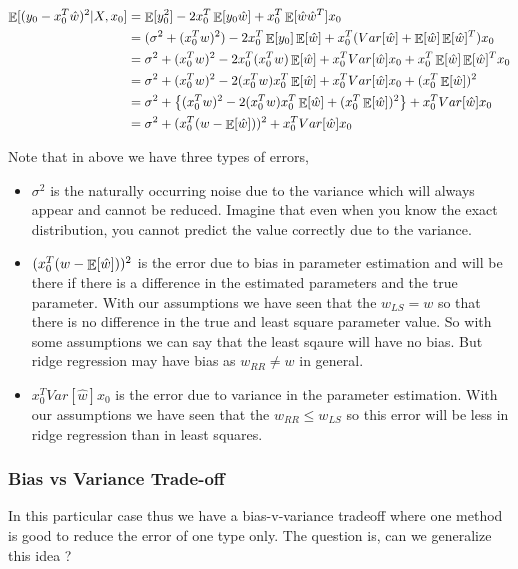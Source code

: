 \documentclass{article}
\begin{document}
\begin{align*}
    \operatorname*{\mathop{\mathbb{E}}}[(y_0-x_0^T\hat{w})^2 \vert X, x_0] &= \operatorname*{\mathop{\mathbb{E}}}[y_0^2] - 2x_0^T\operatorname*{\mathop{\mathbb{E}}}[y_0\hat{w}] + x_0^T\operatorname*{\mathop{\mathbb{E}}}[\hat{w}\hat{w}^T]x_0\\
    &= (\sigma^2 + (x_0^Tw)^2) - 2x_0^T\operatorname*{\mathop{\mathbb{E}}}[y_0]\operatorname*{\mathop{\mathbb{E}}}[\hat{w}] + x_0^T (Var[\hat{w}] + \operatorname*{\mathop{\mathbb{E}}}[\hat{w}]\operatorname*{\mathop{\mathbb{E}}}[\hat{w}]^T) x_0\\
    &= \sigma^2 + (x_0^Tw)^2 - 2x_0^T (x_0^Tw) \operatorname*{\mathop{\mathbb{E}}}[\hat{w}] + x_0^T Var[\hat{w}]x_0 + x_0^T \operatorname*{\mathop{\mathbb{E}}}[\hat{w}]\operatorname*{\mathop{\mathbb{E}}}[\hat{w}]^T x_0\\
    &= \sigma^2 + (x_0^Tw)^2 - 2(x_0^Tw) x_0^T \operatorname*{\mathop{\mathbb{E}}}[\hat{w}] + x_0^T Var[\hat{w}]x_0 + (x_0^T \operatorname*{\mathop{\mathbb{E}}}[\hat{w}])^2\\
    &= \sigma^2 + \left\{ (x_0^Tw)^2 - 2(x_0^Tw) x_0^T \operatorname*{\mathop{\mathbb{E}}}[\hat{w}] + (x_0^T \operatorname*{\mathop{\mathbb{E}}}[\hat{w}])^2 \right\} + x_0^T Var[\hat{w}]x_0\\
    &= \sigma^2 + (x_0^T (w - \operatorname*{\mathop{\mathbb{E}}}[\hat{w}]))^2 + x_0^T Var[\hat{w}]x_0\\   
\end{align*}

Note that in above we have three types of errors,
\begin{itemize}
    \item {} $\sigma^2$ is the naturally occurring noise due to the variance which will always appear and cannot be reduced. Imagine that even when you know the exact distribution, you cannot predict the value correctly due to the variance.
    \item {} $(x_0^T (w - \operatorname*{\mathop{\mathbb{E}}}[\hat{w}]))^2$ is the error due to bias in parameter estimation and will be there if there is a difference in the estimated parameters and the true parameter. With our assumptions we have seen that the $w_{LS}=w$ so that there is no difference in the true and least square parameter value. So with some assumptions we can say that the least sqaure will have no bias. But ridge regression may have bias as $w_{RR} \neq w$ in general.
    \item {} $x_0^T Var[\hat{w}]x_0$ is the error due to variance in the parameter estimation. With our assumptions we have seen that the $w_{RR} \leq w_{LS}$ so this error will be less in ridge regression than in least squares.
\end{itemize}

\subsubsection{Bias vs Variance Trade-off}
In this particular case thus we have a bias-v-variance tradeoff where one method is good to reduce the error of one type only. The question is, can we generalize this idea ?
\end{document}
